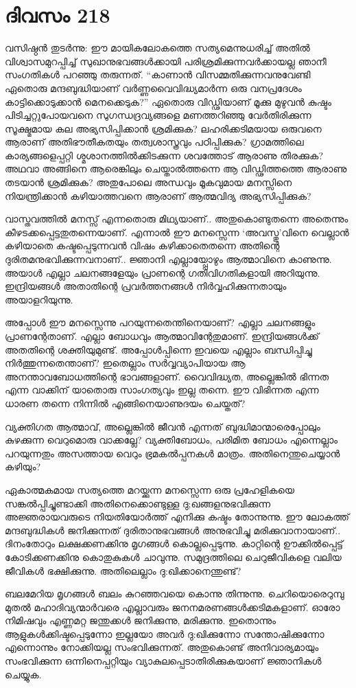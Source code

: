 \section{ദിവസം 218}


വസിഷ്ഠൻ തുടർന്നു: ഈ മായികലോകത്തെ സത്യമെന്നുധരിച്ച് അതിൽ വിശ്വാസമുറപ്പിച്ച് സുഖാനുഭവങ്ങൾക്കായി പരിശ്രമിക്കുന്നവർക്കായല്ല ഞാനീ സംഗതികൾ പറഞ്ഞു തരുന്നത്. “കാണാൻ വിസമ്മതിക്കുന്നവനുവേണ്ടി ഏതൊരു മന്ദബുദ്ധിയാണ്‌ വർണ്ണവൈവിദ്ധ്യമാർന്ന ഒരു വനപ്രദേശം കാട്ടിക്കൊടുക്കാൻ മെനക്കെടുക?” ഏതൊരു വിഡ്ഢിയാണ്‌ മൂക്കു മുഴുവൻ കുഷ്ടം പിടിച്ചറ്റുപോയവനെ സുഗന്ധദ്രവ്യങ്ങളെ മണത്തറിഞ്ഞു വേർതിരിക്കുന്ന സൂക്ഷ്മമായ കല അഭ്യസിപ്പിക്കാൻ ശ്രമിക്കുക? ലഹരിക്കടിമയായ ഒരുവനെ ആരാണ്‌ അതിഭൗതീകതയും തത്വശാസ്ത്രവും പഠിപ്പിക്കുക? ഗ്രാമത്തിലെ കാര്യങ്ങളെപ്പറ്റി ശ്മശാനത്തിൽക്കിടക്കുന്ന ശവത്തോട് ആരാണു തിരക്കുക? അഥവാ അങ്ങിനെ ആരെങ്കിലും ചെയ്താൽത്തന്നെ ആ വിഡ്ഢിത്തത്തെ ആരാണു തടയാൻ ശ്രമിക്കുക? അതുപോലെ അന്ധവും മൂകവുമായ മനസ്സിനെ നിയന്ത്രിക്കാൻ കഴിയാത്തവനെ ആരാണ്‌ ആത്മവിദ്യ അഭ്യസിപ്പിക്കുക?

വാസ്തവത്തിൽ മനസ്സ് എന്നതൊരു മിഥ്യയാണ്‌..  അതുകൊണ്ടുതന്നെ അതെന്നും കീഴടക്കപ്പെട്ടതുതന്നെയാണ്‌.  എന്നാൽ ഈ മനസ്സെന്ന ‘അവസ്തു’വിനെ വെല്ലാൻ കഴിയാതെ കഷ്ടപ്പെടുന്നവൻ വിഷം കഴിക്കാതെതന്നെ അതിന്റെ ദുരിതമനുഭവിക്കുന്നവനാണ്‌..  ജ്ഞാനി എല്ലായ്പ്പോഴും ആത്മാവിനെ കാണുന്നു. അയാൾ എല്ലാ ചലനങ്ങളേയും പ്രാണന്റെ ഗതിവിഗതികളായി അറിയുന്നു. ഇന്ദ്രിയങ്ങൾ അതാതിന്റെ പ്രവർത്തനങ്ങൾ നിർവ്വഹിക്കുന്നതായും അയാളറിയുന്നു.

അപ്പോൾ ഈ മനസ്സെന്നു പറയുന്നതെന്തിനെയാണ്‌? എല്ലാ ചലനങ്ങളും പ്രാണന്റേതാണ്‌.  എല്ലാ ബോധവും ആത്മാവിന്റേതുമാണ്‌.  ഇന്ദ്രിയങ്ങൾക്ക് അതതിന്റെ ശക്തിയുമുണ്ട്. അപ്പോൾപ്പിന്നെ ഇവയെ എല്ലാം ബന്ധിപ്പിച്ചു നിർത്തുന്നതെന്താണ്‌? ഇതെല്ലാം സർവ്വവ്യാപിയായ ആ അനന്താവബോധത്തിന്റെ ഭാവങ്ങളാണ്‌.  വൈവിദ്ധ്യത, അല്ലെങ്കിൽ ഭിന്നത എന്ന വാക്കിന്‌ യാതൊരു സാംഗത്യവും ഇല്ല തന്നെ. ഈ വിഭിന്നത എന്ന ധാരണ തന്നെ നിന്നിൽ എങ്ങിനെയാണുദയം ചെയ്തത്?

വ്യക്തിഗത ആത്മാവ്, അല്ലെങ്കിൽ ജീവൻ എന്നത് ബുദ്ധിമാന്മാരെപ്പോലും കുഴക്കുന്ന വെറുമൊരു വാക്കല്ലേ? വ്യക്തിബോധം, പരിമിത ബോധം എന്നെല്ലാം പറയുന്നതും അസത്തായ വെറും ഭ്രമകൽപ്പനകൾ മാത്രം. അതിനെന്തുചെയ്യാൻ കഴിയും?

ഏകാത്മകമായ സത്യത്തെ മറയ്ക്കുന്ന മനസ്സെന്ന ഒരു പ്രഹേളികയെ സങ്കൽപ്പിച്ചുണ്ടാക്കി അതിനെക്കൊണ്ടുള്ള ദു;ഖങ്ങളനുഭവിക്കുന്ന അജ്ഞരായവരുടെ നിയതിയോർത്ത് എനിക്കു കഷ്ടം തോന്നുന്നു. ഈ ലോകത്ത് മന്ദബുദ്ധികൾ ജനിക്കുന്നത് ദുരിതാനുഭവങ്ങൾ അനുഭവിച്ചു മരിക്കുവാനായാണ്‌..  ദിനംതോറും ലക്ഷക്കണക്കിനു മൃഗങ്ങൾ കൊല്ലപ്പെടുന്നു. കാറ്റിന്റെ ഊക്കിൽപ്പെട്ട് കോടിക്കണക്കിനു കൊതുകുകൾ ചാവുന്നു. സമുദ്രത്തിലെ ചെറുജീവികളെ വലിയ ജീവികൾ ഭക്ഷിക്കുന്നു. അതിലെല്ലാം ദു:ഖിക്കാനെന്തുണ്ട്?

ബലമേറിയ മൃഗങ്ങൾ ബലം കുറഞ്ഞവയെ കൊന്നു തിന്നുന്നു. ചെറിയൊരെറുമ്പു മുതൽ മഹാദിവ്യന്മാർവരെ എല്ലാവരും ജനനമരണങ്ങൾക്കടിമകളാണ്‌.  ഓരോ നിമിഷവും എണ്ണമറ്റ ജന്തുക്കൾ ജനിക്കുന്നു, മരിക്കുന്നു. ഇതൊന്നും ആളുകൾക്കിഷ്ടപ്പെടുന്നോ ഇല്ലയോ അവർ ദു:ഖിക്കുന്നോ സന്തോഷിക്കുന്നോ എന്നൊന്നും നോക്കിയല്ല സംഭവിക്കുന്നത്. അതുകൊണ്ട് അനിവാര്യമായും സംഭവിക്കുന്ന ഒന്നിനെപ്പറ്റിയും വ്യാകുലപ്പെടാതിരിക്കുകയാണ്‌ ജ്ഞാനികൾ ചെയ്യുക.
